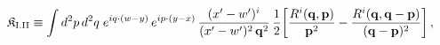 \begingroup\small
\begin{align}\label{eq:K-rm_I_II}
&\mathfrak{K}_{\rm I.II}\equiv \int d^{2}p\, d^{2}q\;e^{iq\cdot(w-y)}\, e^{ip\cdot(y-x)}\, \frac{(x'-w')^{i}}{(x'-w')^{2}\,\mathbf{q}^{2}}\, \frac{1}{2}\bigg[\frac{R^{i}(\mathbf{q},\mathbf{p})}{\mathbf{p}^{2}} -\frac{R^{i}(\mathbf{q},\mathbf{q}-\mathbf{p})}{(\mathbf{q}-\mathbf{p})^{2}}\bigg]\,,
\end{align}
\endgroup
